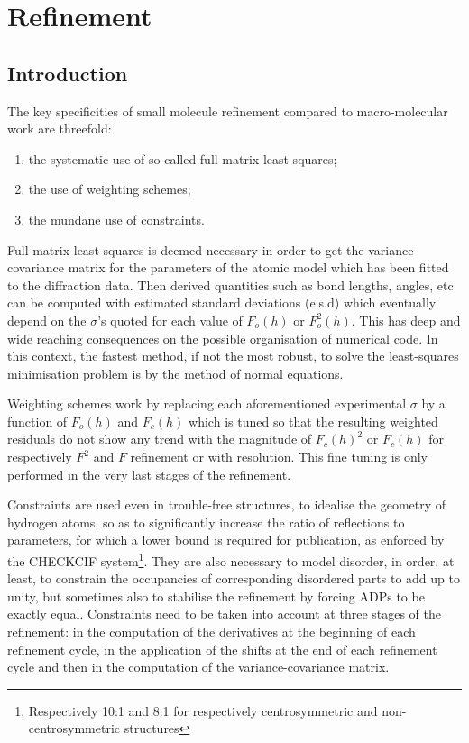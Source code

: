 \documentclass[12pt]{article}
\begin{document}
\section{Refinement}
\label{refinement}
\subsection{Introduction}

The key specificities of small molecule refinement compared to macro-molecular work are threefold:
\begin{enumerate}
\item the systematic use of so-called full matrix least-squares;\label{fullmatrix}
\item the use of weighting schemes;\label{weightingschemes}
\item the mundane use of constraints.\label{constraints}
\end{enumerate}

Full matrix least-squares is deemed necessary in order to get the variance-covariance matrix for the parameters of the atomic model which has been fitted to the diffraction data. Then derived quantities such as bond lengths, angles, etc can be computed with estimated standard deviations (e.s.d) which eventually depend on the $\sigma$'s quoted for each value of $F_o(h)$ or $F_o^2(h)$. This has deep and wide reaching consequences on the possible organisation of numerical code. In this context, the fastest method, if not the most robust, to solve the least-squares minimisation problem is by the method of normal equations.

Weighting schemes work by replacing each aforementioned experimental $\sigma$ by a function of $F_o(h)$ and $F_c(h)$ which is tuned so that the resulting weighted residuals do not show any trend with the magnitude of $F_c(h)^2$ or $F_c(h)$ for respectively $F^2$ and $F$ refinement or with resolution. This fine tuning is only performed in the very last stages of the refinement.

Constraints are used even in trouble-free structures, to idealise the geometry of hydrogen atoms, so as to significantly increase the ratio of reflections to parameters, for which a lower bound is required for publication, as enforced by the CHECKCIF system\footnote{Respectively 10:1 and 8:1 for respectively centrosymmetric and non-centrosymmetric structures}. They are also necessary to model disorder, in order, at least, to constrain the occupancies of corresponding disordered parts to add up to unity, but sometimes also to stabilise the refinement by forcing ADPs to be exactly equal. Constraints need to be taken into account at three stages of the refinement: in the computation of the derivatives at the beginning of each refinement cycle, in the application of the shifts at the end of each refinement cycle and then in the computation of the variance-covariance matrix.
\end{document}
